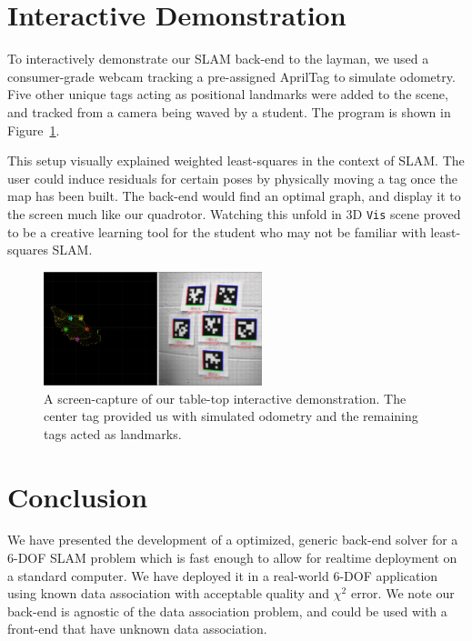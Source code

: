 \documentclass[conference]{IEEEtran}
\begin{document}
\section{Interactive Demonstration}

To interactively demonstrate our \ac{SLAM} back-end to the layman, we
used a consumer-grade webcam tracking a pre-assigned AprilTag to
simulate odometry.  Five other unique tags acting as positional
landmarks were added to the scene, and tracked from a camera being
waved by a student.  The program is shown in
Figure~\ref{fig:interactiveDemo}.

This setup visually explained weighted least-squares in the context of
\ac{SLAM}.  The user could induce residuals for certain poses by
physically moving a tag once the map has been built.  The back-end
would find an optimal graph, and display it to the screen much like
our quadrotor.  Watching this unfold in 3D \texttt{Vis} scene proved
to be a creative learning tool for the student who may not be familiar
with least-squares SLAM.

\begin{figure}[h]
  \centering
  \includegraphics[width=2.5in]{images/interactiveDemo}
  \caption{A screen-capture of our table-top interactive
    demonstration.  The center tag provided us with simulated odometry
  and the remaining tags acted as landmarks.}
  \label{fig:interactiveDemo}
\end{figure}

\section{Conclusion}
\label{sec:conclusion}

We have presented the development of a optimized, generic back-end solver for a 6-\ac{DOF}
\ac{SLAM} problem which is fast enough to allow for realtime deployment on a standard
computer.  We have deployed it in a real-world 6-\ac{DOF} application using known data
association with acceptable quality and $\chi^2$ error.  We note our back-end is agnostic
of the data association problem, and could be used with a front-end that have unknown data
association.




\end{document}
